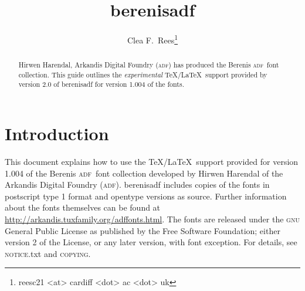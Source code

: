 \documentclass[11pt,british]{article}
\title{berenisadf}
\author{Clea F.\ Rees\footnote{reesc21 <at> cardiff <dot> ac <dot> uk}}
\date{\dyddiad}
\begin{document}
\maketitle\thispagestyle{empty}
\setlength{\parindent}{0pt}
\setlength{\parskip}{0.5em}


\newcommand*{\adf}{\textsc{adf}}
\newcommand*{\lpack}[1]{\textsf{#1}}
\newcommand*{\fgroup}[1]{\textsf{#1}}
\newcommand*{\fname}[1]{\textsf{#1}}

\begin{abstract}
	\hspace*{-\parindent}Hirwen Harendal, Arkandis Digital Foundry (\adf) has produced the Berenis \adf\ font collection. This guide outlines the \emph{experimental} \TeX/\LaTeX\ support provided by version 2.0 of \lpack{berenisadf} for version 1.004 of the fonts.
\end{abstract}

\tableofcontents

\section{Introduction}

This document explains how to use the \TeX/\LaTeX\ support provided for version 1.004 of the Berenis \adf\ font collection developed by Hirwen Harendal of the Arkandis Digital Foundry (\adf). \lpack{berenisadf} includes copies of the fonts in postscript type 1 format and opentype versions as source. Further  information about the fonts themselves can be found at \url{http://arkandis.tuxfamily.org/adffonts.html}. The fonts are released under the \textsc{gnu} General Public License as published by the Free Software Foundation; either version 2 of the License, or any later version, with font exception. For details, see \textsc{notice}.txt and \textsc{copying}.
\end{document}
